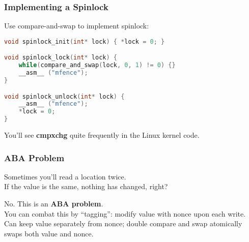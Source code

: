\begin{frame}[fragile]
  \frametitle{Implementing a Spinlock}

  
  Use compare-and-swap to implement spinlock:
  \begin{lstlisting}[language=C]
void spinlock_init(int* lock) { *lock = 0; }

void spinlock_lock(int* lock) {
    while(compare_and_swap(lock, 0, 1) != 0) {}
    __asm__ ("mfence");
}

void spinlock_unlock(int* lock) {
    __asm__ ("mfence");
    *lock = 0;  
}
  \end{lstlisting}
  You'll see {\bf cmpxchg} quite frequently in the Linux kernel code.
  
\end{frame}

\begin{frame}[fragile]
  \frametitle{ABA Problem}

  
    Sometimes you'll read a location twice.\\[1em]

    If the value is the same, nothing has changed, right?

    \pause

    \alert{No.} This is an {\bf ABA problem}.\\[1em]

    You can combat this by ``tagging'': modify value with nonce upon each write.\\[1em]

    Can keep value separately from nonce; double compare and swap atomically swaps both value and nonce.\\[2em]


  
\end{frame}

